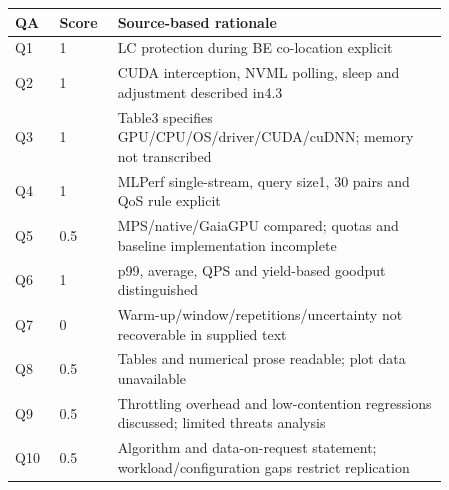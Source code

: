 \begin{longtable}{P{0.09\linewidth}P{0.10\linewidth}P{0.67\linewidth}}
\toprule QA & Score & Source-based rationale\\\midrule\endhead
Q1 & 1 & LC protection during BE co-location explicit\\
Q2 & 1 & CUDA interception, NVML polling, sleep and adjustment described in4.3\\
Q3 & 1 & Table3 specifies GPU/CPU/OS/driver/CUDA/cuDNN; memory not transcribed\\
Q4 & 1 & MLPerf single-stream, query size1, 30 pairs and QoS rule explicit\\
Q5 & 0.5 & MPS/native/GaiaGPU compared; quotas and baseline implementation incomplete\\
Q6 & 1 & p99, average, QPS and yield-based goodput distinguished\\
Q7 & 0 & Warm-up/window/repetitions/uncertainty not recoverable in supplied text\\
Q8 & 0.5 & Tables and numerical prose readable; plot data unavailable\\
Q9 & 0.5 & Throttling overhead and low-contention regressions discussed; limited threats analysis\\
Q10 & 0.5 & Algorithm and data-on-request statement; workload/configuration gaps restrict replication\\
\bottomrule\end{longtable}

